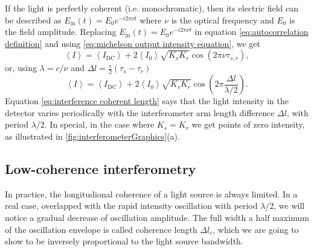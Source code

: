 \documentclass[12pt,twoside,english]{book}
\renewcommand{\~}{\perispomeni}%
\numberwithin{equation}{section}
\numberwithin{figure}{section}
\begin{document}
If the light is perfectly coherent (i.e. monochromatic), then its electric field can be described as $E_{\text{in}}\left(t\right)=E_{0}e^{-i2\pi\nu t}$ where $\nu$ is the optical frequency and $E_{0}$ is the field amplitude. Replacing $E_{\text{in}}\left(t\right)=E_{0}e^{-i2\pi\nu t}$ in equation \ref{eq:autocorrelation definition} and using \ref{eq:michelson output intensity equation}, we get
\begin{equation}
\left\langle I\right\rangle =\left\langle I_{\text{DC}}\right\rangle +2\left\langle I_{0}\right\rangle \sqrt{K_{s}K_{r}}\cos\left(2\pi\nu\tau_{s,r}\right),\label{eq:interference coherent delay}\end{equation}
or, using $\lambda=c/\nu$ and $\Delta l=\frac{c}{2}\left(\tau_{s}-\tau_{r}\right)$
\begin{equation}
\left\langle I\right\rangle =\left\langle I_{\text{DC}}\right\rangle +2\left\langle I_{0}\right\rangle \sqrt{K_{s}K_{r}}\cos\left(2\pi\frac{\Delta l}{\lambda/2}\right).\label{eq:interference coherent length}\end{equation}
Equation \ref{eq:interference coherent length} says that the light intensity in the detector varies periodically with the interferometer arm length difference $\Delta l$, with period $\lambda/2$. In special, in the case where $K_{s}=K_{r}$ we get points of zero intensity, as illustrated in \ref{fig:interferometerGraphics}(a). 


\subsection{Low-coherence interferometry}
\label{sub:Low-coherence interferometry}

In practice, the longitudional coherence of a light source is always limited. In a real case, overlapped with the rapid intensity oscillation with period $\lambda/2$, we will notice a gradual decrease of oscillation amplitude. The full width a half maximum of the oscillation envelope is called \gls{coherence length} $\Delta l_{c}$, which we are going to show to be inversely proportional to the light source bandwidth.
\end{document}
